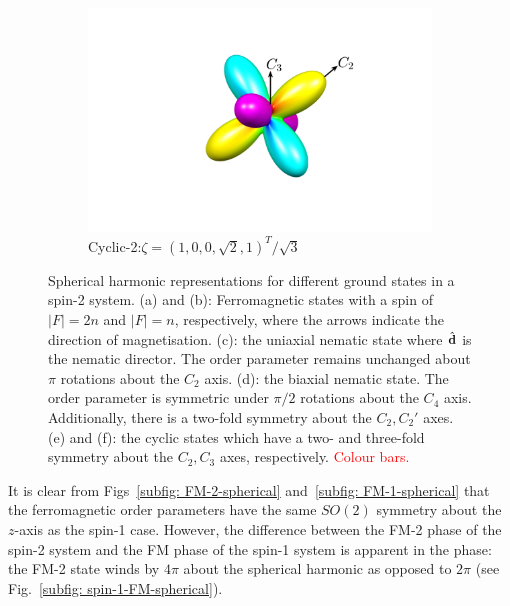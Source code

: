 \begin{figure}
\begin{subfigure}{0.49\textwidth}
        \includegraphics[width=\textwidth]
        {gfx/ch-groundStateSymmetries/C2-spherical.pdf}
        \caption{\label{subfig: C-2-spherical}
        Cyclic-2:\@ \(\zeta={(1, 0, 0, \sqrt{2}, 1)}^T/\sqrt{3}\)}
    \end{subfigure}
    \caption[Spherical harmonic representation of spin-2 ground states]
    {\label{fig: spin-2-spherical-harmonics}Spherical harmonic
        representations for different ground states in a spin-2 system.
        (a) and (b): Ferromagnetic states with a spin of \(|F|=2n\) and
        \(|F|=n\), respectively, where the arrows indicate the direction of
        magnetisation.
        (c): the uniaxial nematic state where \(\hat{\vb{d}}\) is the nematic
        director. The order parameter remains unchanged about \(\pi \) rotations
        about the \(C_2\) axis.
        (d): the biaxial nematic state. The order parameter is symmetric under
        \(\pi/2\) rotations about the \(C_4\) axis.
        Additionally, there is a two-fold symmetry about the \(C_2, C_2'\) axes.
        (e) and (f): the cyclic states which have a two- and three-fold symmetry
        about the \(C_2, C_3\) axes, respectively.
        \textcolor{red}{Colour bars.}}
\end{figure}

It is clear from Figs~\ref{subfig: FM-2-spherical}
and~\ref{subfig: FM-1-spherical} that the ferromagnetic order parameters have
the same \(SO(2)\) symmetry about the \(z\)-axis as the spin-1 case.
However, the difference between the FM-2 phase of the spin-2 system and the FM
phase of the spin-1 system is apparent in the phase: the FM-2 state winds by
\(4\pi \) about the spherical harmonic as opposed to \(2\pi \)
(see Fig.~\ref{subfig: spin-1-FM-spherical}).

